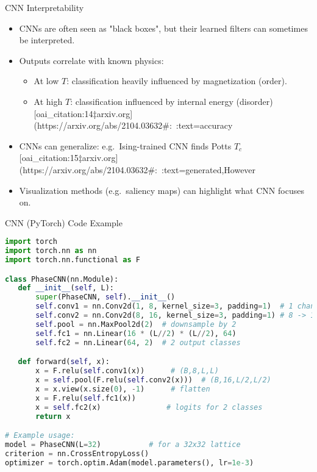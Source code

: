 \documentclass{beamer}
\begin{document}
\begin{frame}{CNN Interpretability}
 \begin{itemize}
   \item CNNs are often seen as "black boxes", but their learned filters can sometimes be interpreted.
   \item Outputs correlate with known physics:
     \begin{itemize}
       \item At low $T$: classification heavily influenced by magnetization (order).
       \item At high $T$: classification influenced by internal energy (disorder) [oai_citation:14‡arxiv.org](https://arxiv.org/abs/2104.03632#:~:text=accuracy%
     \end{itemize}
   \item CNNs can generalize: e.g.\ Ising-trained CNN finds Potts $T_c$ [oai_citation:15‡arxiv.org](https://arxiv.org/abs/2104.03632#:~:text=generated,However%
   \item Visualization methods (e.g.\ saliency maps) can highlight what CNN focuses on.
 \end{itemize}
\end{frame}

\begin{frame}[fragile]{CNN (PyTorch) Code Example}
 \begin{lstlisting}[language=Python]
import torch
import torch.nn as nn
import torch.nn.functional as F

class PhaseCNN(nn.Module):
   def __init__(self, L):
       super(PhaseCNN, self).__init__()
       self.conv1 = nn.Conv2d(1, 8, kernel_size=3, padding=1)  # 1 channel -> 8
       self.conv2 = nn.Conv2d(8, 16, kernel_size=3, padding=1) # 8 -> 16
       self.pool = nn.MaxPool2d(2)  # downsample by 2
       self.fc1 = nn.Linear(16 * (L//2) * (L//2), 64)
       self.fc2 = nn.Linear(64, 2)  # 2 output classes

   def forward(self, x):
       x = F.relu(self.conv1(x))      # (B,8,L,L)
       x = self.pool(F.relu(self.conv2(x)))  # (B,16,L/2,L/2)
       x = x.view(x.size(0), -1)      # flatten
       x = F.relu(self.fc1(x))
       x = self.fc2(x)               # logits for 2 classes
       return x

# Example usage:
model = PhaseCNN(L=32)           # for a 32x32 lattice
criterion = nn.CrossEntropyLoss()
optimizer = torch.optim.Adam(model.parameters(), lr=1e-3)
 \end{lstlisting}
\end{frame}
\end{document}
